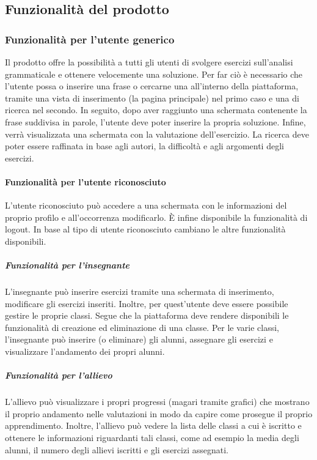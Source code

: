 \subsection{Funzionalità del prodotto}
	\subsubsection{Funzionalità per l'utente generico}
	Il prodotto offre la possibilità a tutti gli utenti di svolgere esercizi sull'analisi grammaticale e ottenere velocemente una soluzione. Per far ciò è necessario che l'utente possa o inserire una frase o cercarne una all'interno della piattaforma, tramite una vista di inserimento (la pagina principale) nel primo caso e una di ricerca nel secondo. In seguito, dopo aver raggiunto una schermata contenente la frase suddivisa in parole, l'utente deve poter inserire la propria soluzione. Infine, verrà visualizzata una schermata con la valutazione dell'esercizio.
	La ricerca deve poter essere raffinata in base agli autori, la difficoltà e agli argomenti degli esercizi.
	\paragraph{Funzionalità per l'utente riconosciuto\\}
	L'utente riconosciuto può accedere a una schermata con le informazioni del proprio profilo e all'occorrenza modificarlo. \`E infine disponibile la funzionalità di logout. In base al tipo di utente riconosciuto cambiano le altre funzionalità disponibili.
	\subparagraph{Funzionalità per l'insegnante\\}
	L'insegnante può inserire esercizi tramite una schermata di inserimento, modificare gli esercizi inseriti. Inoltre, per quest'utente deve essere possibile gestire le proprie classi. Segue che la piattaforma deve rendere disponibili le funzionalità di creazione ed eliminazione di una classe. Per le varie classi, l'insegnante può inserire (o eliminare) gli alunni, assegnare gli esercizi e visualizzare l'andamento dei propri alunni.
	\subparagraph{Funzionalità per l'allievo\\}
	L'allievo può visualizzare i propri progressi (magari tramite grafici) che mostrano il proprio andamento nelle valutazioni in modo da capire come prosegue il proprio apprendimento. Inoltre, l'allievo può vedere la lista delle classi a cui è iscritto e ottenere le informazioni riguardanti tali classi, come ad esempio la media degli alunni, il numero degli allievi iscritti e gli esercizi assegnati.

